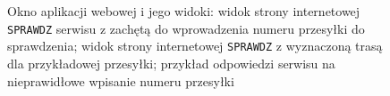 \documentclass[eng,printmode,oneside]{mgr}
\begin{document}
\begin{figure}
\centering
\captionsetup{justification=centering,margin=1cm}
\caption{Okno aplikacji webowej i jego widoki:  widok strony
internetowej \texttt{SPRAWDZ} serwisu z zachętą do wprowadzenia numeru przesyłki do
sprawdzenia;  widok strony internetowej \texttt{SPRAWDZ} z
wyznaczoną trasą dla przykładowej przesyłki;  przykład
odpowiedzi serwisu na nieprawidłowe wpisanie numeru przesyłki}
\end{figure}
\end{document}

